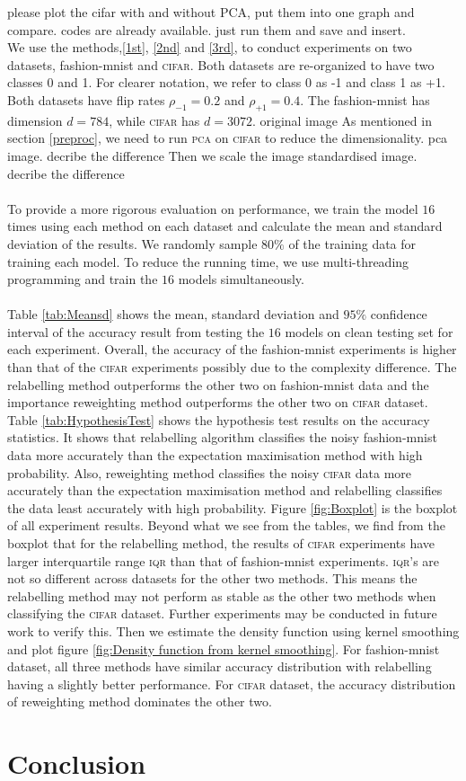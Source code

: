 \documentclass[12pt]{article} %
\newcommand{\rhoo}{\rho_{+1}}
\newcommand{\rhoz}{\rho_{-1}}
\begin{document}
{\color{red} please plot the cifar with and without PCA, put them into one graph and compare. codes are already available. just run them and save and insert.}\\
We use the methods,\ref{1st}, \ref{2nd} and \ref{3rd}, to conduct experiments on two datasets, fashion-mnist and \textsc{cifar}.
Both datasets are re-organized to have two classes 0 and 1. 
For clearer notation, we refer to class 0 as -1 and class 1 as +1. 
Both datasets have flip rates $\rhoz=0.2$ and $\rhoo=0.4$.
The fashion-mnist has dimension $d=784$, while \textsc{cifar} has $d=3072$. 
{\color{red} original image}
As mentioned in section \ref{preproc}, we need to run \textsc{pca} on \textsc{cifar} to reduce the dimensionality.
{\color{red} pca image. decribe the difference}
Then we scale the image
{\color{red} standardised image. decribe the difference} \\ \\
To provide a more rigorous evaluation on performance, we train the model $16$ times using each method on each dataset and calculate the mean and standard deviation of the results.
We randomly sample $80\%$ of the training data for training each model.
To reduce the running time, we use multi-threading programming and train the $16$ models simultaneously. \\ \\
Table \ref{tab:Meansd} shows the mean, standard deviation and $95\%$ confidence interval of the accuracy result from testing the $16$ models on clean testing set for each experiment. 
Overall, the accuracy of the fashion-mnist experiments is higher than that of the \textsc{cifar} experiments possibly due to the complexity difference.
The relabelling method outperforms the other two on fashion-mnist data and the importance reweighting method outperforms the other two on \textsc{cifar} dataset.
Table \ref{tab:HypothesisTest} shows the hypothesis test results on the accuracy statistics. 
It shows that relabelling algorithm classifies the noisy fashion-mnist data more accurately than the expectation maximisation method with high probability.
Also, reweighting method classifies the noisy \textsc{cifar} data more accurately than the expectation maximisation method and relabelling classifies the data least accurately with high probability. 
Figure \ref{fig:Boxplot} is the boxplot of all experiment results. 
Beyond what we see from the tables, we find from the boxplot that for the relabelling method, the results of \textsc{cifar} experiments have larger interquartile range \textsc{iqr} than that of fashion-mnist experiments. 
\textsc{iqr}'s are not so different across datasets for the other two methods. 
This means the relabelling method may not perform as stable as the other two methods when classifying the \textsc{cifar} dataset. 
Further experiments may be conducted in future work to verify this. 
Then we estimate the density function using kernel smoothing and plot figure \ref{fig:Density function from kernel smoothing}.
For fashion-mnist dataset, all three methods have similar accuracy distribution with relabelling having a slightly better performance.
For \textsc{cifar} dataset, the accuracy distribution of reweighting method dominates the other two.

\section{Conclusion}
\label{headings}





\end{document}
